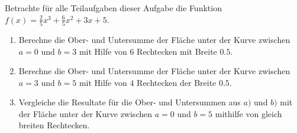 \documentclass[11pt,oneside]{article}
\begin{document}
	\begin{aufgabe}
		Betrachte für alle Teilaufgaben dieser Aufgabe die Funktion $f(x)=\frac{2}{5}x^3+\frac{6}{5}x^2+3x+5$.
		\begin{enumerate}[label=\alph*)]
			\item Berechne die Ober- und Untersumme der Fläche unter der Kurve zwischen $a=0$ und $b=3$ mit Hilfe von $6$ Rechtecken mit Breite $0.5$.
			\item Berechne die Ober- und Untersumme der Fläche unter der Kurve zwischen $a=3$ und $b=5$ mit Hilfe von $4$ Rechtecken der Breite $0.5$.
			\item Vergleiche die Resultate für die Ober- und Untersummen aus $a)$ und $b)$ mit der Fläche unter der Kurve zwischen $a=0$ und $b=5$ mithilfe von gleich breiten Rechtecken.
		\end{enumerate}
	\end{aufgabe}
	\newpage
\end{document}

